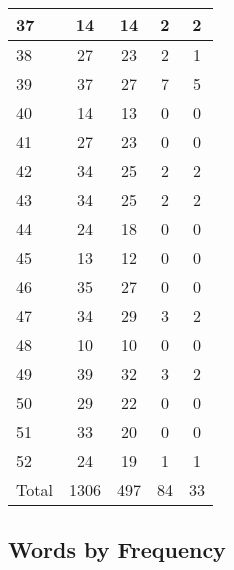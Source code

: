 \begin{center}
\begin{longtable}{l|c|c|c|c}
37 & 14 & 14 & 2 & 2\\ \hline
38 & 27 & 23 & 2 & 1\\ \hline
39 & 37 & 27 & 7 & 5\\ \hline
40 & 14 & 13 & 0 & 0\\ \hline
41 & 27 & 23 & 0 & 0\\ \hline
42 & 34 & 25 & 2 & 2\\ \hline
43 & 34 & 25 & 2 & 2\\ \hline
44 & 24 & 18 & 0 & 0\\ \hline
45 & 13 & 12 & 0 & 0\\ \hline
46 & 35 & 27 & 0 & 0\\ \hline
47 & 34 & 29 & 3 & 2\\ \hline
48 & 10 & 10 & 0 & 0\\ \hline
49 & 39 & 32 & 3 & 2\\ \hline
50 & 29 & 22 & 0 & 0\\ \hline
51 & 33 & 20 & 0 & 0\\ \hline
52 & 24 & 19 & 1 & 1\\ \hline
\hline \hline
Total & 1306 & 497 & 84 & 33



\end{longtable}
\end{center}

 
\subsection{Words by Frequency}


